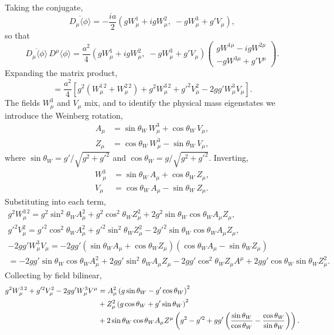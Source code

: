 Taking the conjugate,
\begin{equation}
	\overline{D_\mu\langle\phi\rangle}
	= -\frac{ia}{2}\left(gW_\mu^1+igW_\mu^2,\;
	-gW_\mu^3+g'V_\mu\right),
\end{equation}
so that
\begin{equation}
	\overline{D_\mu\langle\phi\rangle}\,D^\mu\langle\phi\rangle
	= \frac{a^2}{4}\left(gW_\mu^1+igW_\mu^2,\;
	-gW_\mu^3+g'V_\mu\right)
	\begin{pmatrix}gW^{1\mu}-igW^{2\mu} \\
		-gW^{3\mu}+g'V^\mu\end{pmatrix}.
\end{equation}
Expanding the matrix product,
\begin{equation}
	= \frac{a^2}{4}\left[g^2(W_\mu^{1\,2}+W_\mu^{2\,2})
		+ g^2W_\mu^{3\,2} + g'^2V_\mu^2
		- 2gg'W_\mu^3 V_\mu\right].
\end{equation}
The fields $W_\mu^3$ and $V_\mu$ mix, and to identify the physical mass
eigenstates we introduce the Weinberg rotation,
\begin{align}
	A_\mu & = \sin\theta_W\,W_\mu^3 + \cos\theta_W\,V_\mu, \\
	Z_\mu & = \cos\theta_W\,W_\mu^3 - \sin\theta_W\,V_\mu,
\end{align}
where $\sin\theta_W = g'/\sqrt{g^2+g'^2}$ and
$\cos\theta_W = g/\sqrt{g^2+g'^2}$. Inverting,
\begin{align}
	W_\mu^3 & = \sin\theta_W\,A_\mu + \cos\theta_W\,Z_\mu, \\
	V_\mu   & = \cos\theta_W\,A_\mu - \sin\theta_W\,Z_\mu.
\end{align}
Substituting into each term,
\begin{multline}
	g^2W_\mu^{3\,2} = g^2\sin^2\theta_W A_\mu^2
	+ g^2\cos^2\theta_W Z_\mu^2
	+ 2g^2\sin\theta_W\cos\theta_W A_\mu Z_\mu, \\
	g'^2V_\mu^2 = g'^2\cos^2\theta_W A_\mu^2
	+ g'^2\sin^2\theta_W Z_\mu^2
	- 2g'^2\sin\theta_W\cos\theta_W A_\mu Z_\mu, \\
	-2gg'W_\mu^3 V_\mu
	= -2gg'(\sin\theta_W A_\mu+\cos\theta_W Z_\mu)
	(\cos\theta_W A_\mu-\sin\theta_W Z_\mu) \\
	= -2gg'\sin\theta_W\cos\theta_W A_\mu^2
	+ 2gg'\sin^2\theta_W A_\mu Z_\mu
	- 2gg'\cos^2\theta_W Z_\mu A^\mu
	+ 2gg'\cos\theta_W\sin\theta_W Z_\mu^2.
\end{multline}
Collecting by field bilinear,
\begin{align}
	g^2W_\mu^{3\,2} + g'^2V_\mu^2 - 2gg'W_\mu^3 V^\mu
	 & = A_\mu^2\left(g\sin\theta_W-g'\cos\theta_W\right)^2 \notag \\
	 & + Z_\mu^2\left(g\cos\theta_W+g'\sin\theta_W\right)^2 \notag \\
	 & + 2\sin\theta_W\cos\theta_W A_\mu Z^\mu
	\left(g^2-g'^2+gg'\left(\frac{\sin\theta_W}{\cos\theta_W}
	-\frac{\cos\theta_W}{\sin\theta_W}\right)\right).
\end{align}
